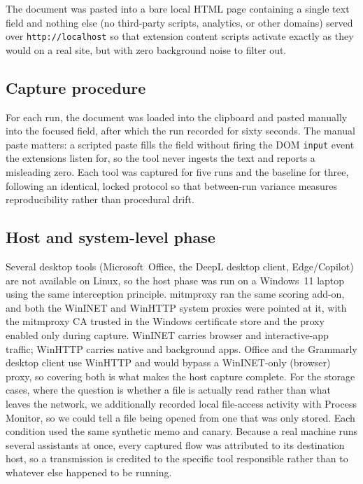 \documentclass[sigconf,anonymous,review,balance=false]{acmart}
\begin{document}
The document was pasted into a bare local HTML page containing a single text field and
nothing else (no third-party scripts, analytics, or other domains) served over
\texttt{http://localhost} so that extension content scripts activate exactly as they
would on a real site, but with zero background noise to filter out.

\subsection{Capture procedure}

For each run, the document was loaded into the clipboard and pasted manually into the
focused field, after which the run recorded for sixty seconds. The manual paste matters: a scripted paste fills the field without firing the DOM
\texttt{input} event the extensions listen for, so the tool never ingests the text and
reports a misleading zero. Each tool was captured for
five runs and the baseline for three, following an identical, locked
protocol so that between-run variance measures reproducibility rather than procedural
drift.

\subsection{Host and system-level phase}
Several desktop tools (Microsoft~Office, the DeepL desktop client, Edge/Copilot) are not
available on Linux, so the host phase was run on a Windows~11 laptop using the same
interception principle. mitmproxy ran the same scoring add-on, and both the WinINET and
WinHTTP system proxies were pointed at it, with the mitmproxy CA trusted in the Windows
certificate store and the proxy enabled only during capture. WinINET carries browser and
interactive-app traffic; WinHTTP carries native and background apps. Office and the Grammarly desktop
client use WinHTTP and would bypass a WinINET-only (browser) proxy, so covering both is
what makes the host capture complete. For the storage cases, where the question is whether
a file is actually read rather than what leaves the network, we additionally recorded local
file-access activity with Process Monitor, so we could tell a file being opened from one that was only stored. Each
condition used the same synthetic memo and canary. Because a real machine runs several
assistants at once, every captured flow was attributed to its destination host, so a
transmission is credited to the specific tool responsible rather than to whatever else
happened to be running.
\end{document}
